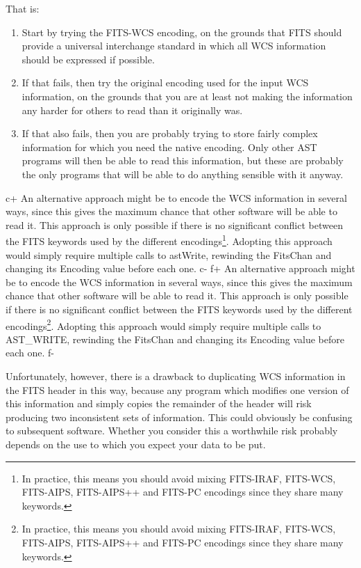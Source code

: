 \documentclass[twoside,11pt]{starlink}
\begin{document}
That is:

\begin{enumerate}
\item Start by trying the FITS-WCS encoding, on the grounds that FITS
should provide a universal interchange standard in which all WCS
information should be expressed if possible.

\item If that fails, then try the original encoding used for the input
WCS information, on the grounds that you are at least not making the
information any harder for others to read than it originally was.

\item If that also fails, then you are probably trying to store fairly
complex information for which you need the native encoding. Only other
AST programs will then be able to read this information, but these are
probably the only programs that will be able to do anything sensible
with it anyway.
\end{enumerate}

c+
An alternative approach might be to encode the WCS information in several
ways, since this gives the maximum chance that other software will be
able to read it. This approach is only possible if there is no
significant conflict between the FITS keywords used by the different
encodings\footnote{In practice, this means you should avoid mixing
FITS-IRAF, FITS-WCS, FITS-AIPS, FITS-AIPS++ and FITS-PC encodings since they share
many keywords.}.  Adopting this approach would simply require multiple
calls to astWrite, rewinding the FitsChan and changing its Encoding value
before each one.
c-
f+
An alternative approach might be to encode the WCS information in several
ways, since this gives the maximum chance that other software will be
able to read it. This approach is only possible if there is no
significant conflict between the FITS keywords used by the different
encodings\footnote{In practice, this means you should avoid mixing
FITS-IRAF, FITS-WCS, FITS-AIPS, FITS-AIPS++ and FITS-PC encodings since they share
many keywords.}.  Adopting this approach would simply require multiple
calls to AST\_WRITE, rewinding the FitsChan and changing its Encoding value
before each one.
f-

Unfortunately, however, there is a drawback to duplicating WCS
information in the FITS header in this way, because any program which
modifies one version of this information and simply copies the
remainder of the header will risk producing two inconsistent sets of
information. This could obviously be confusing to subsequent
software. Whether you consider this a worthwhile risk probably depends
on the use to which you expect your data to be put.
\end{document}
